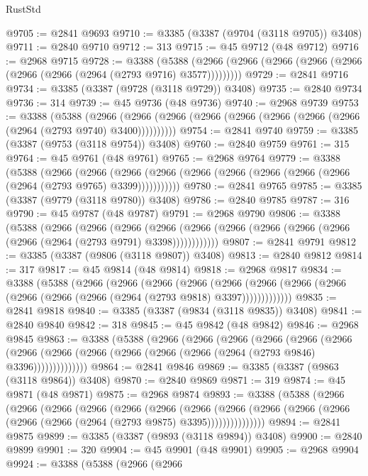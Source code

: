 \begin{lexlean}{RustStd}
\begin{coremodule}
@9705 := @2841 @9693
@9710 := @3385 (@3387 (@9704 (@3118 @9705)) @3408)
@9711 := @2840 @9710
@9712 := 313
@9715 := @45 @9712 (@48 @9712)
@9716 := @2968 @9715
@9728 := @3388
    (@5388 (@2966 (@2966 (@2966 (@2966 (@2966 (@2966 (@2966 (@2964 (@2793 @9716) @3577)))))))))
@9729 := @2841 @9716
@9734 := @3385 (@3387 (@9728 (@3118 @9729)) @3408)
@9735 := @2840 @9734
@9736 := 314
@9739 := @45 @9736 (@48 @9736)
@9740 := @2968 @9739
@9753 := @3388
    (@5388
      (@2966 (@2966 (@2966 (@2966 (@2966 (@2966 (@2966 (@2966 (@2964 (@2793 @9740) @3400))))))))))
@9754 := @2841 @9740
@9759 := @3385 (@3387 (@9753 (@3118 @9754)) @3408)
@9760 := @2840 @9759
@9761 := 315
@9764 := @45 @9761 (@48 @9761)
@9765 := @2968 @9764
@9779 := @3388
    (@5388
      (@2966
        (@2966
          (@2966 (@2966 (@2966 (@2966 (@2966 (@2966 (@2966 (@2964 (@2793 @9765) @3399)))))))))))
@9780 := @2841 @9765
@9785 := @3385 (@3387 (@9779 (@3118 @9780)) @3408)
@9786 := @2840 @9785
@9787 := 316
@9790 := @45 @9787 (@48 @9787)
@9791 := @2968 @9790
@9806 := @3388
    (@5388
      (@2966
        (@2966
          (@2966
            (@2966 (@2966 (@2966 (@2966 (@2966 (@2966 (@2966 (@2964 (@2793 @9791) @3398))))))))))))
@9807 := @2841 @9791
@9812 := @3385 (@3387 (@9806 (@3118 @9807)) @3408)
@9813 := @2840 @9812
@9814 := 317
@9817 := @45 @9814 (@48 @9814)
@9818 := @2968 @9817
@9834 := @3388
    (@5388
      (@2966
        (@2966
          (@2966
            (@2966
              (@2966
                (@2966 (@2966 (@2966 (@2966 (@2966 (@2966 (@2964 (@2793 @9818) @3397)))))))))))))
@9835 := @2841 @9818
@9840 := @3385 (@3387 (@9834 (@3118 @9835)) @3408)
@9841 := @2840 @9840
@9842 := 318
@9845 := @45 @9842 (@48 @9842)
@9846 := @2968 @9845
@9863 := @3388
    (@5388
      (@2966
        (@2966
          (@2966
            (@2966
              (@2966
                (@2966
                  (@2966 (@2966 (@2966 (@2966 (@2966 (@2966 (@2964 (@2793 @9846) @3396))))))))))))))
@9864 := @2841 @9846
@9869 := @3385 (@3387 (@9863 (@3118 @9864)) @3408)
@9870 := @2840 @9869
@9871 := 319
@9874 := @45 @9871 (@48 @9871)
@9875 := @2968 @9874
@9893 := @3388
    (@5388
      (@2966
        (@2966
          (@2966
            (@2966
              (@2966
                (@2966
                  (@2966
                    (@2966
                      (@2966 (@2966 (@2966 (@2966 (@2966 (@2964 (@2793 @9875) @3395)))))))))))))))
@9894 := @2841 @9875
@9899 := @3385 (@3387 (@9893 (@3118 @9894)) @3408)
@9900 := @2840 @9899
@9901 := 320
@9904 := @45 @9901 (@48 @9901)
@9905 := @2968 @9904
@9924 := @3388
    (@5388
      (@2966
        (@2966

\end{coremodule}
\end{lexlean}
